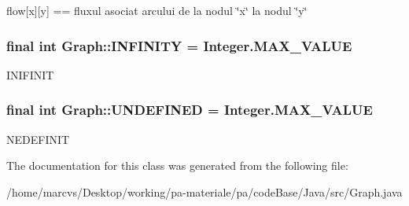 flow\mbox{[}x\mbox{]}\mbox{[}y\mbox{]} == fluxul asociat arcului de la nodul \char`\"{}x\char`\"{} la nodul \char`\"{}y\char`\"{} \hypertarget{classGraph_a282d3ae4575cc3764258ecdb2d8e8fdf}{
\subsubsection[{INFINITY}]{\setlength{\rightskip}{0pt plus 5cm}final int {\bf Graph::INFINITY} = Integer.MAX\_\-VALUE}}
\label{classGraph_a282d3ae4575cc3764258ecdb2d8e8fdf}
INIFINIT \hypertarget{classGraph_a2dbb2805720a0812f5df6a58d38956af}{
\subsubsection[{UNDEFINED}]{\setlength{\rightskip}{0pt plus 5cm}final int {\bf Graph::UNDEFINED} = Integer.MAX\_\-VALUE}}
\label{classGraph_a2dbb2805720a0812f5df6a58d38956af}
NEDEFINIT 

The documentation for this class was generated from the following file:\begin{DoxyCompactItemize}
\item 
/home/marcvs/Desktop/working/pa-\/materiale/pa/codeBase/Java/src/Graph.java\end{DoxyCompactItemize}
